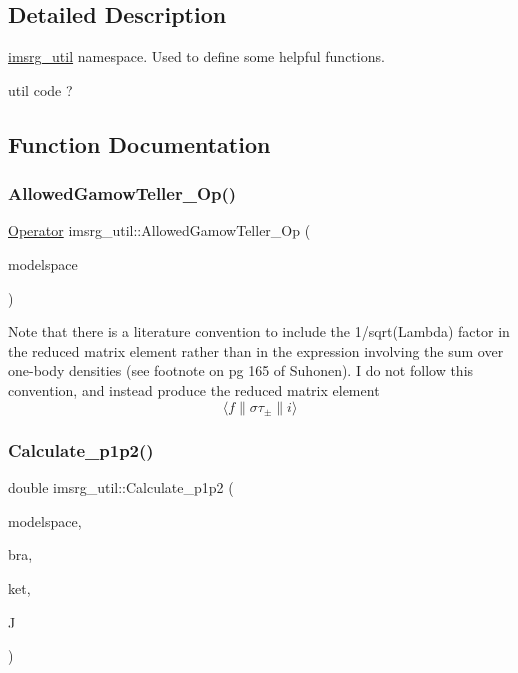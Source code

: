 \subsection{Detailed Description}
\hyperlink{namespaceimsrg__util}{imsrg\+\_\+util} namespace. Used to define some helpful functions. 

util code ? 

\subsection{Function Documentation}
\mbox{\label{namespaceimsrg__util_a06db1031b1af9f760afd2014632dd36d}} 
\subsubsection{\texorpdfstring{Allowed\+Gamow\+Teller\+\_\+\+Op()}{AllowedGamowTeller\_Op()}}
{\footnotesize\ttfamily \hyperlink{classOperator}{Operator} imsrg\+\_\+util\+::\+Allowed\+Gamow\+Teller\+\_\+\+Op (\begin{DoxyParamCaption}\item[{\hyperlink{classModelSpace}{Model\+Space} \&}]{modelspace }\end{DoxyParamCaption})}

Note that there is a literature convention to include the 1/sqrt(Lambda) factor in the reduced matrix element rather than in the expression involving the sum over one-\/body densities (see footnote on pg 165 of Suhonen). I do not follow this convention, and instead produce the reduced matrix element \[ \langle f \| \sigma \tau_{\pm} \| i \rangle \] \mbox{\label{namespaceimsrg__util_a3aad21447b8e28d22597a79220ba805a}} 
\subsubsection{\texorpdfstring{Calculate\+\_\+p1p2()}{Calculate\_p1p2()}}
{\footnotesize\ttfamily double imsrg\+\_\+util\+::\+Calculate\+\_\+p1p2 (\begin{DoxyParamCaption}\item[{\hyperlink{classModelSpace}{Model\+Space} \&}]{modelspace,  }\item[{\hyperlink{classKet}{Ket} \&}]{bra,  }\item[{\hyperlink{classKet}{Ket} \&}]{ket,  }\item[{int}]{J }\end{DoxyParamCaption})}

